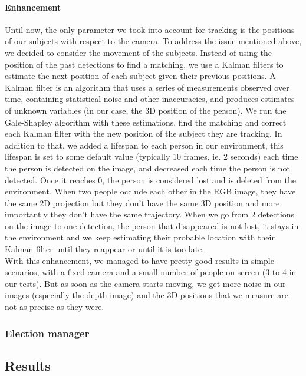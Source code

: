 \documentclass[a4paper, twocolumn]{article}
\begin{document}
    \paragraph{Enhancement} Until now, the only parameter we took into account for tracking is the positions of our subjects with respect to the camera. To address the issue mentioned above, we decided to consider the movement of the subjects. Instead of using the position of the past detections to find a matching, we use a Kalman filters to estimate the next position of each subject given their previous positions. A Kalman filter is an algorithm that uses a series of measurements observed over time, containing statistical noise and other inaccuracies, and produces estimates of unknown variables (in our case, the 3D position of the person). We run the Gale-Shapley algorithm with these estimations, find the matching and correct each Kalman filter with the new position of the subject they are tracking. In addition to that, we added a lifespan to each person in our environment, this lifespan is set to some default value (typically 10 frames, ie. 2 seconds) each time the person is detected on the image, and decreased each time the person is not detected. Once it reaches 0, the person is considered lost and is deleted from the environment. When two people occlude each other in the RGB image, they have the same 2D projection but they don't have the same 3D position and more importantly they don't have the same trajectory. When we go from 2 detections on the image to one detection, the person that disappeared is not lost, it stays in the environment and we keep estimating their probable location with their Kalman filter until they reappear or until it is too late.\\

    With this enhancement, we managed to have pretty good results in simple scenarios, with a fixed camera and a small number of people on screen (3 to 4 in our tests). But as soon as the camera starts moving, we get more noise in our images (especially the depth image) and the 3D positions that we measure are not as precise as they were.

    \subsubsection{Election manager}
    
    \subsection{Results}
\end{document}
